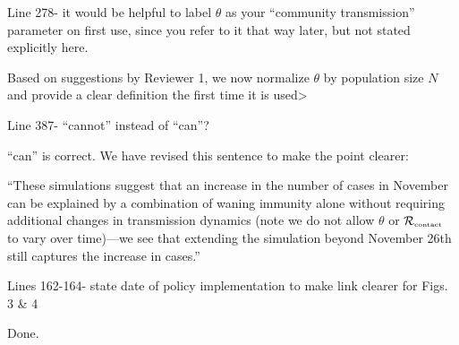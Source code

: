\documentclass[12pt]{article}
\newcommand{\Rx}[1]{\ensuremath{{\mathcal R}_{#1}}}
\newcommand{\Rc}{\Rx{\textrm{\tiny{contact}}}}
\newcommand{\revtext}{\textsf}
\begin{document}
\revtext{Line 278- it would be helpful to label $\theta$ as your “community transmission” parameter on first use, since you refer to it that way later, but not stated explicitly here.}

Based on suggestions by Reviewer 1, we now normalize $\theta$ by population size $N$ and provide a clear definition the first time it is used>

\revtext{Line 387- “cannot” instead of “can”?}

``can'' is correct. We have revised this sentence to make the point clearer:

``These simulations suggest that an increase in the number of cases in November can be explained by a combination of waning immunity alone without requiring additional changes in transmission dynamics (note we do not allow $\theta$ or $\Rc$ to vary over time)---we see that extending the simulation beyond November 26th still captures the increase in cases.''

\revtext{Lines 162-164- state date of policy implementation to make link clearer for Figs. 3 \& 4} 

Done.


\end{document}
